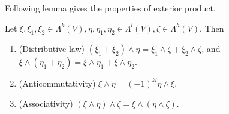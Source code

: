 Following lemma gives the properties of exterior product.

\begin{lemma}
    Let $\xi, \xi_1, \xi_2 \in \Lambda^k(V), \eta, \eta_1, \eta_2 \in \Lambda^l(V), \zeta \in \Lambda^h(V)$. Then
    \begin{enumerate}
        \item (Distributive law) $(\xi_1 + \xi_2) \wedge \eta = \xi_1 \wedge \zeta + \xi_2 \wedge \zeta$, and $\xi \wedge (\eta_1 + \eta_2) = \xi \wedge \eta_1 + \xi \wedge \eta_2$.
        \item (Anticommutativity) $\xi \wedge \eta = (-1)^{kl}\eta \wedge \xi$.
        \item (Associativity) $(\xi \wedge \eta) \wedge \zeta = \xi \wedge (\eta \wedge \zeta)$.
    \end{enumerate}
\end{lemma}


